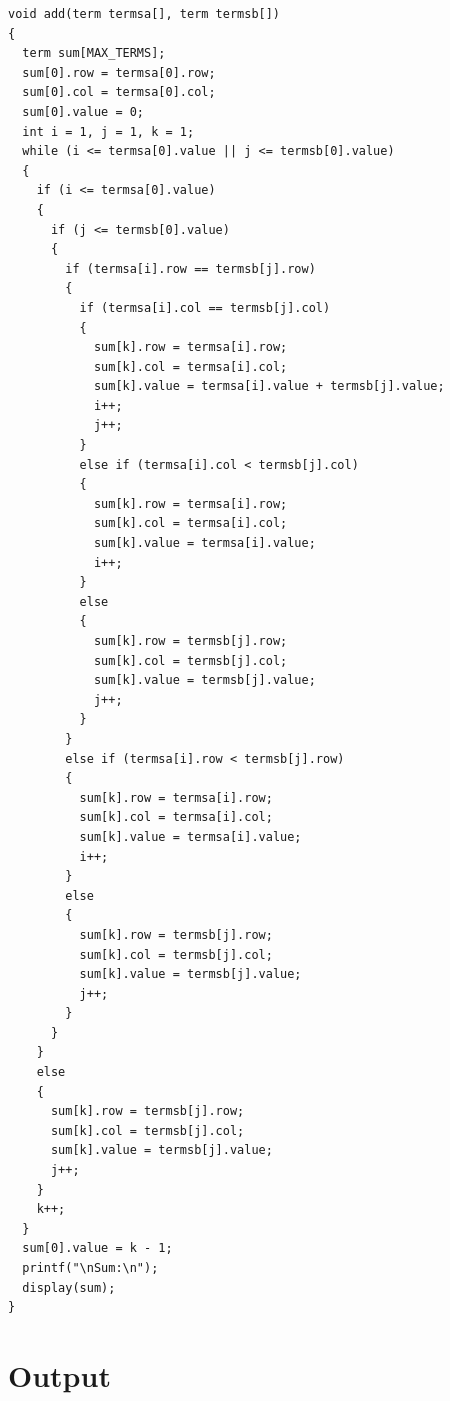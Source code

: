 \begin{lstlisting}[label={list:c_program}]
void add(term termsa[], term termsb[])
{
  term sum[MAX_TERMS];
  sum[0].row = termsa[0].row;
  sum[0].col = termsa[0].col;
  sum[0].value = 0;
  int i = 1, j = 1, k = 1;
  while (i <= termsa[0].value || j <= termsb[0].value)
  {
    if (i <= termsa[0].value)
    {
      if (j <= termsb[0].value)
      {
        if (termsa[i].row == termsb[j].row)
        {
          if (termsa[i].col == termsb[j].col)
          {
            sum[k].row = termsa[i].row;
            sum[k].col = termsa[i].col;
            sum[k].value = termsa[i].value + termsb[j].value;
            i++;
            j++;
          }
          else if (termsa[i].col < termsb[j].col)
          {
            sum[k].row = termsa[i].row;
            sum[k].col = termsa[i].col;
            sum[k].value = termsa[i].value;
            i++;
          }
          else
          {
            sum[k].row = termsb[j].row;
            sum[k].col = termsb[j].col;
            sum[k].value = termsb[j].value;
            j++;
          }
        }
        else if (termsa[i].row < termsb[j].row)
        {
          sum[k].row = termsa[i].row;
          sum[k].col = termsa[i].col;
          sum[k].value = termsa[i].value;
          i++;
        }
        else
        {
          sum[k].row = termsb[j].row;
          sum[k].col = termsb[j].col;
          sum[k].value = termsb[j].value;
          j++;
        }
      }
    }
    else
    {
      sum[k].row = termsb[j].row;
      sum[k].col = termsb[j].col;
      sum[k].value = termsb[j].value;
      j++;
    }
    k++;
  }
  sum[0].value = k - 1;
  printf("\nSum:\n");
  display(sum);
}
\end{lstlisting}

\section{Output}

